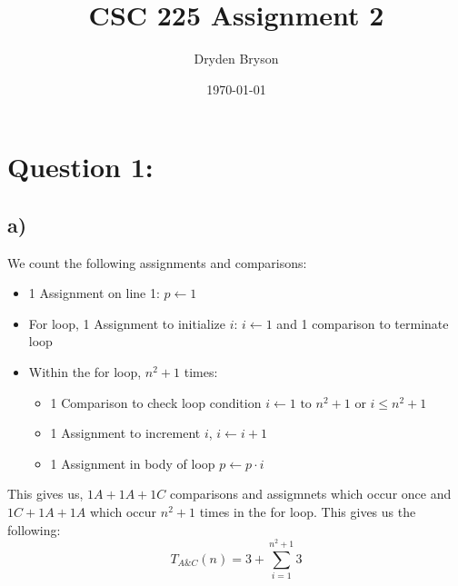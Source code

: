 \documentclass{article}
\title{CSC 225 Assignment 2}
\author{Dryden Bryson}
\date{\today}
\begin{document}
\maketitle
\newpage
\section*{Question 1:}
\subsection*{a)}
We count the following assignments and comparisons:
\begin{itemize}
    \item 1 Assignment on line 1: $\boxed{p \leftarrow 1}$
    \item For loop, 1 Assignment to initialize $i$: $\boxed{ i \leftarrow 1}$ and 1 comparison to terminate loop
    \item Within the for loop, $n^{2}+1$ times: \begin{itemize}
        \item 1 Comparison to check loop condition $\boxed{i\leftarrow 1 \text{ to } n^{2}+1}$ or $\boxed{i\leq n^{2}+1}$
        \item 1 Assignment to increment $i$, $\boxed{i\leftarrow i+1}$
        \item 1 Assignment in body of loop $\boxed{p\leftarrow p\cdot i}$
    \end{itemize}
\end{itemize}
This gives us, $1A+1A+1C$ comparisons and assigmnets which occur once and $1C+1A+1A$ which occur $n^{2}+1$ times in the for loop. This gives us the following: $$T_{A\&C}(n)=3+\sum_{i=1}^{n^{2}+1}3$$
\end{document}
